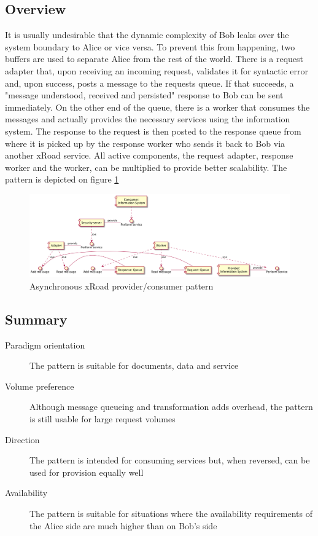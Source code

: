\documentclass[10pt,a4paper]{article}
\begin{document}
\subsection{Overview}
It is usually undesirable that the dynamic complexity  of Bob leaks over the system boundary to Alice or vice versa. To prevent this from happening, two buffers are used to separate Alice from the rest of the world. There is a request adapter that, upon receiving an incoming request, validates it for syntactic error and, upon success, posts a message to the requests queue. If that succeeds, a "message understood, received and persisted" response to Bob can be sent immediately. On the other end of the queue, there is a worker that consumes the messages and actually provides the necessary services using the information system. The response to the request is then posted to the response queue from where it is picked up by the response worker who sends it back to Bob via another xRoad service. All active components, the request adapter, response worker and the worker, can be multiplied to provide better scalability. The pattern is depicted on figure \ref{fig:p:5}

\begin{figure}[htp]
	\begin{center}
		\includegraphics[width=1\textwidth]{gfx/5_comp.png}
		\caption{Asynchronous xRoad provider/consumer pattern}
		\label{fig:p:5}
	\end{center}
\end{figure}

\subsection{Summary}
\begin{description}
	\item[Paradigm orientation] The pattern is suitable for documents, data and service
	\item[Volume preference] Although message queueing and transformation adds overhead, the pattern is still usable for large request volumes
	\item[Direction] The pattern is intended for consuming services but, when reversed, can be used for provision equally well
	\item[Availability] The pattern is suitable for situations where the availability requirements of the Alice side are much higher than on Bob's side
\end{description}
\end{document}
